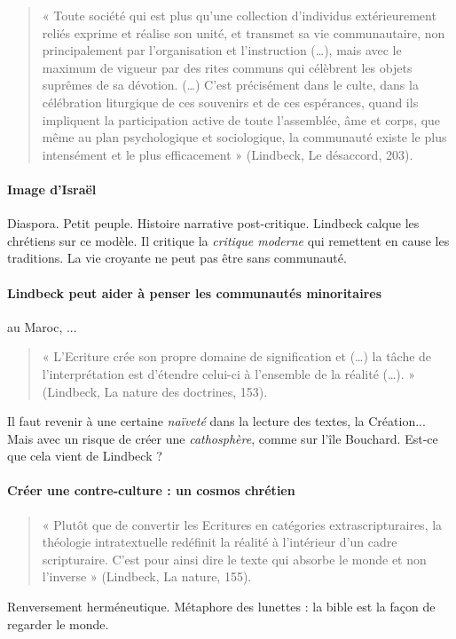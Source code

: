 \begin{quote}
    « Toute société qui est plus qu’une collection d’individus extérieurement reliés exprime et réalise son
unité, et transmet sa vie communautaire, non principalement par l’organisation et l’instruction (…),
mais avec le maximum de vigueur par des rites communs qui célèbrent les objets suprêmes de sa
dévotion. (…) C’est précisément dans le culte, dans la célébration liturgique de ces souvenirs et de ces
espérances, quand ils impliquent la participation active de toute l’assemblée, âme et corps, que même
au plan psychologique et sociologique, la communauté existe le plus intensément et le plus
efficacement » (Lindbeck, Le désaccord, 203).
\end{quote}

\paragraph{Image d'Israël} Diaspora. Petit peuple. Histoire narrative post-critique. Lindbeck calque les chrétiens sur ce modèle. Il critique la \textit{critique moderne} qui remettent en cause les traditions. La vie croyante ne peut pas être sans communauté.

\paragraph{Lindbeck peut aider à penser les communautés minoritaires} au Maroc, ... 

\begin{quote}
    « L’Ecriture crée son propre domaine de signification et (…) la tâche de l’interprétation est d’étendre
celui-ci à l’ensemble de la réalité (…). » (Lindbeck, La nature des doctrines, 153).

\end{quote}

  Il faut revenir à une certaine \textit{naïveté} dans la lecture des textes, la Création... Mais avec un risque de créer une \textit{cathosphère}, comme sur l'île Bouchard. Est-ce que cela vient de Lindbeck ? 

  \paragraph{Créer une contre-culture : un cosmos chrétien}
\begin{quote}
  « Plutôt que de convertir les Ecritures en catégories extrascripturaires, la théologie intratextuelle
redéfinit la réalité à l’intérieur d’un cadre scripturaire. C’est pour ainsi dire le texte qui absorbe le
monde et non l’inverse » (Lindbeck, La nature, 155).
\end{quote}
 Renversement herméneutique.  Métaphore des lunettes : la bible est la façon de regarder le monde.

